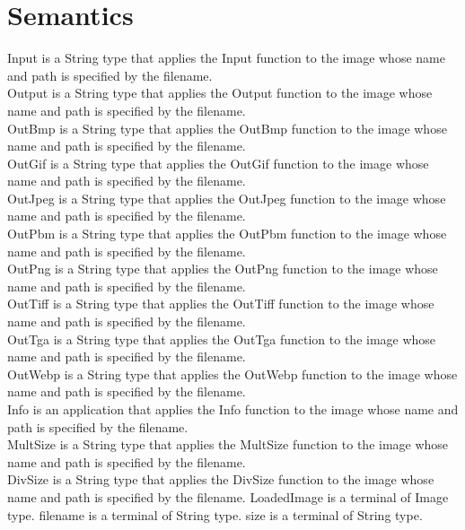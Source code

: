 \documentclass{article}
\begin{document}
\section{Semantics}

Input is a String type that applies the Input function to the image whose name and path is specified by the filename. 
\\Output is a String type that applies the Output function to the image whose name and path is specified by the filename. 
\\OutBmp is a String type that applies the OutBmp function to the image whose name and path is specified by the filename. 
\\OutGif is a String type that applies the OutGif function to the image whose name and path is specified by the filename. 
\\OutJpeg is a String type that applies the OutJpeg function to the image whose name and path is specified by the filename. 
\\OutPbm is a String type that applies the OutPbm function to the image whose name and path is specified by the filename. 
\\OutPng is a String type that applies the OutPng function to the image whose name and path is specified by the filename. 
\\OutTiff is a String type that applies the OutTiff function to the image whose name and path is specified by the filename. 
\\OutTga is a String type that applies the OutTga function to the image whose name and path is specified by the filename. 
\\OutWebp is a String type that applies the OutWebp function to the image whose name and path is specified by the filename. 
\\Info is an application that applies the Info function to the image whose name and path is specified by the filename. 
\\MultSize is a String type that applies the MultSize function to the image whose name and path is specified by the filename. 
\\DivSize is a String type that applies the DivSize function to the image whose name and path is specified by the filename. 
LoadedImage is a terminal of Image type. 
filename is a terminal of String type. 
size is a terminal of String type. 
\end{document}
